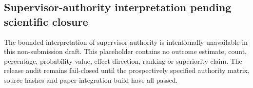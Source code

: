 \subsection{Supervisor-authority interpretation pending scientific closure}

The bounded interpretation of supervisor authority is intentionally unavailable
in this non-submission draft. This placeholder contains no outcome estimate,
count, percentage, probability value, effect direction, ranking or superiority
claim. The release audit remains fail-closed until the prospectively specified authority
matrix, source hashes and paper-integration build have all passed.

